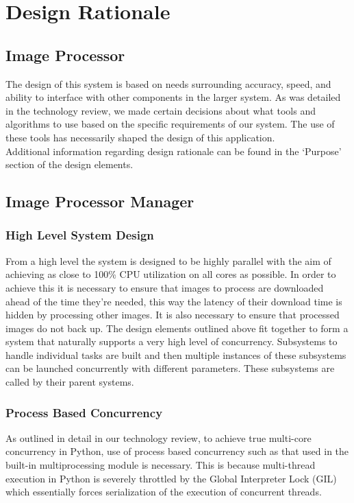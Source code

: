 \documentclass[10pt, onecolumn, draftclsnofoot, letterpaper, compsoc]{IEEEtran}
\begin{document}
\section{Design Rationale}

\subsection{Image Processor}

The design of this system is based on needs surrounding accuracy, speed, and
ability to interface with other components in the larger system. As was detailed
in the technology review, we made certain decisions about what tools and
algorithms to use based on the specific requirements of our system. The use of
these tools has necessarily shaped the design of this application.\\

Additional information regarding design rationale can be found in the `Purpose'\\
section of the design elements.

\subsection{Image Processor Manager}

    \subsubsection{High Level System Design}
    From a high level the system is designed to be highly parallel with the aim of achieving as close to 
    100\% CPU utilization on all cores as possible. In order to achieve this it is necessary to ensure that 
    images to process are downloaded ahead of the time they're needed, this way the latency of their download 
    time is hidden by processing other images. It is also necessary to ensure that processed images do not back 
    up. The design elements outlined above fit together to form a system that naturally supports a very high 
    level of concurrency. Subsystems to handle individual tasks are built and then multiple instances of these 
    subsystems can be launched concurrently with different parameters. These subsystems are called by their 
    parent systems. \\

    \subsubsection{Process Based Concurrency}
    As outlined in detail in our technology review, to achieve true multi-core concurrency in Python, use of 
    process based concurrency such as that used in the built-in multiprocessing module is necessary. This is 
    because multi-thread execution in Python is severely throttled by the Global Interpreter Lock (GIL) which 
    essentially forces serialization of the execution of concurrent threads. \\
\end{document}

